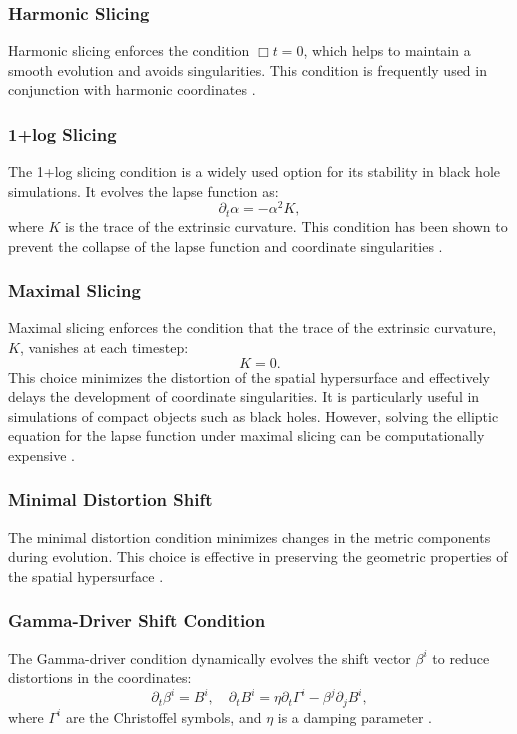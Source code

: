 \documentclass[12pt]{article}
\begin{document}
\subsubsection{Harmonic Slicing}
Harmonic slicing enforces the condition $\Box t = 0$, which helps to maintain a smooth evolution and avoids singularities. This condition is frequently used in conjunction with harmonic coordinates \cite{bona1994gauge}.

\subsubsection{1+log Slicing}
The 1+log slicing condition is a widely used option for its stability in black hole simulations. It evolves the lapse function as:
\[
\partial_t \alpha = -\alpha^2 K,
\]
where $K$ is the trace of the extrinsic curvature. This condition has been shown to prevent the collapse of the lapse function and coordinate singularities \cite{alcubierre2000standard}.

\subsubsection{Maximal Slicing}
Maximal slicing enforces the condition that the trace of the extrinsic curvature, $K$, vanishes at each timestep:
\[
K = 0.
\]
This choice minimizes the distortion of the spatial hypersurface and effectively delays the development of coordinate singularities. It is particularly useful in simulations of compact objects such as black holes. However, solving the elliptic equation for the lapse function under maximal slicing can be computationally expensive \cite{baumgarte2010numerical}.

\subsubsection{Minimal Distortion Shift}
The minimal distortion condition minimizes changes in the metric components during evolution. This choice is effective in preserving the geometric properties of the spatial hypersurface \cite{smarr1979structure}.

\subsubsection{Gamma-Driver Shift Condition}
The Gamma-driver condition dynamically evolves the shift vector $\beta^i$ to reduce distortions in the coordinates:
\[
\partial_t \beta^i = B^i, \quad \partial_t B^i = \eta \partial_t \Gamma^i - \beta^j \partial_j B^i,
\]
where $\Gamma^i$ are the Christoffel symbols, and $\eta$ is a damping parameter \cite{alcubierre2003gauge}.
\end{document}

